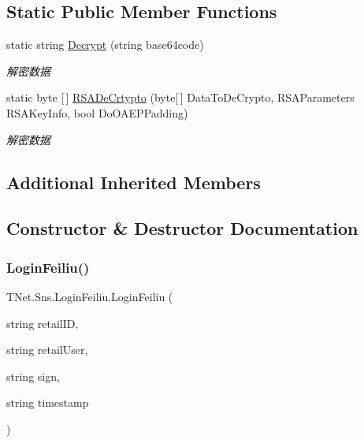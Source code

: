 \subsection*{Static Public Member Functions}
\begin{DoxyCompactItemize}
\item 
static string \mbox{\hyperlink{class_t_net_1_1_sns_1_1_login_feiliu_ae6b8cfcd5df3f335a47c19566f5b045f}{Decrypt}} (string base64code)
\begin{DoxyCompactList}\small\item\em 解密数据 \end{DoxyCompactList}\item 
static byte \mbox{[}$\,$\mbox{]} \mbox{\hyperlink{class_t_net_1_1_sns_1_1_login_feiliu_a6b894098014c172f7e7de1ec1145bd1b}{R\+S\+A\+De\+Crtypto}} (byte\mbox{[}$\,$\mbox{]} Data\+To\+De\+Crypto, R\+S\+A\+Parameters R\+S\+A\+Key\+Info, bool Do\+O\+A\+E\+P\+Padding)
\begin{DoxyCompactList}\small\item\em 解密数据 \end{DoxyCompactList}\end{DoxyCompactItemize}
\subsection*{Additional Inherited Members}


\subsection{Constructor \& Destructor Documentation}
\mbox{\label{class_t_net_1_1_sns_1_1_login_feiliu_a788ea7677c74483fb1dce14dceca574b}} 
\subsubsection{\texorpdfstring{Login\+Feiliu()}{LoginFeiliu()}}
{\footnotesize\ttfamily T\+Net.\+Sns.\+Login\+Feiliu.\+Login\+Feiliu (\begin{DoxyParamCaption}\item[{string}]{retail\+ID,  }\item[{string}]{retail\+User,  }\item[{string}]{sign,  }\item[{string}]{timestamp }\end{DoxyParamCaption})}



